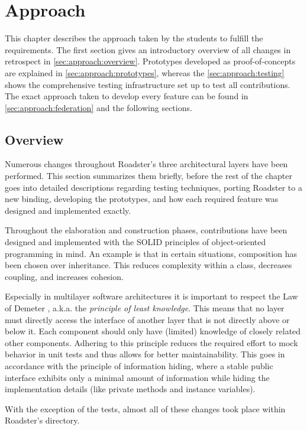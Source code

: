 \chapter{Approach}\label{ch:approach}
This chapter describes the approach taken by the students to fulfill the
requirements. The first section gives an introductory overview of all changes in retrospect
in \autoref{sec:approach:overview}.
Prototypes developed as proof-of-concepts are explained in
\autoref{sec:approach:prototypes}, whereas the \autoref{sec:approach:testing}
shows the comprehensive testing infrastructure set up to test all
contributions.
The exact approach taken to develop every feature can be found in
\autoref{sec:approach:federation} and the following sections.


\section{Overview}\label{sec:approach:overview}
Numerous changes throughout Roadster's three architectural layers have been
performed. This section summarizes them briefly, before the rest of the chapter
goes into detailed descriptions regarding testing techniques, porting Roadster
to a new \zmq binding, developing the prototypes, and how each required feature
was designed and implemented exactly.

Throughout the elaboration and construction phases, contributions have been
designed and implemented with the SOLID principles \cite{wp:solid} of
object-oriented programming in mind. An example is that in certain situations,
composition has been chosen over inheritance. This reduces complexity within a
class, decreases coupling, and increases cohesion.

Especially in multilayer software architectures it is important to respect the
Law of Demeter \cite{wp:demeter}, a.k.a. the \emph{principle of least
knowledge}. This means that no layer must directly access the interface of
another layer that is not directly above or below it. Each component should only
have (limited) knowledge of closely related other components. Adhering to this
principle reduces the required effort to mock behavior in unit tests and thus
allows for better maintainability. This goes in accordance with the principle
of information hiding, where a stable public interface exhibits only a minimal
amount of information while hiding the implementation details (like private
methods and instance variables).

With the exception of the tests, almost all of these changes took place within
Roadster's  directory.


